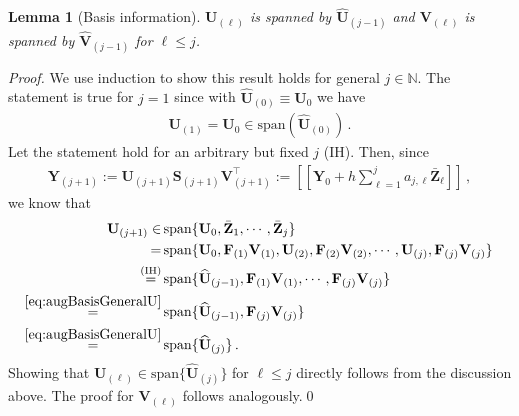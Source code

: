 \documentclass[10pt,a4paper]{amsart}
\newtheorem{lemma}{Lemma}
\newcommand\bfF{{\mathbf F}}
\newcommand\bfS{{\mathbf S}}
\newcommand\bfU{{\mathbf U}}
\newcommand\bfV{{\mathbf V}}
\newcommand\bfY{{\mathbf Y}}
\newcommand\bfZ{{\mathbf Z}}
\begin{document}
\begin{lemma}[Basis information]\label{le:approxU}
    $\bfU_{(\ell)}$ is spanned by $\widehat \bfU_{(j-1)}$ and $\bfV_{(\ell)}$ is spanned by $\widehat \bfV_{(j-1)}$ for $\ell \leq j$.
\end{lemma}

\begin{proof}
We use induction to show this result holds for general $j\in\mathbb{N}$. The statement is true for $j=1$ since with $\widehat \bfU_{(0)} \equiv \bfU_{0}$ we have
\begin{align*}
    \bfU_{(1)} = \bfU_{0} \in \text{span}(\widehat \bfU_{(0)})\,.
\end{align*}
Let the statement hold for an arbitrary but fixed $j$ (IH). Then, since
\begin{align}
    \bfY_{(j+1)}:= \bfU_{(j+1)}\bfS_{(j+1)}\bfV_{(j+1)}^{\top} := [\![\bfY_0 + h\sum_{\ell = 1}^{j}a_{j,\ell}\bar \bfZ_{\ell}]\!]\,,
\end{align}
we know that 
\begin{align*}
    \bfU_{(j+1)} \in\,& \text{span}\{ \bfU_0, \bar \bfZ_1, \cdots,  \bar \bfZ_j\}\,\\
    =\,& \text{span}\{ \bfU_0, \bfF_{(1)}\bfV_{(1)},  \bfU_{(2)}, \bfF_{(2)}\bfV_{(2)}, \cdots,  \bfU_{(j)}, \bfF_{(j)}\bfV_{(j)}\}\,\\
    \stackrel{\mathrm{(IH)}}{=}\,& \text{span}\{ \widehat \bfU_{(j-1)}, \bfF_{(1)}\bfV_{(1)}, \cdots,  \bfF_{(j)}\bfV_{(j)}\}\\
    \stackrel{\mathrm{\eqref{eq:augBasisGeneralU}}}{=}\,& \text{span}\{ \widehat \bfU_{(j-1)}, \bfF_{(j)}\bfV_{(j)}\}\\
    \stackrel{\mathrm{\eqref{eq:augBasisGeneralU}}}{=}\,& \text{span}\{ \widehat \bfU_{(j)}\}\,.
\end{align*}
Showing that $\bfU_{(\ell)}\in \text{span}\{ \widehat \bfU_{(j)}\}$ for $\ell\leq j$ directly follows from the discussion above. The proof for $\bfV_{(\ell)}$ follows analogously.\qed
\end{proof}
\end{document}
